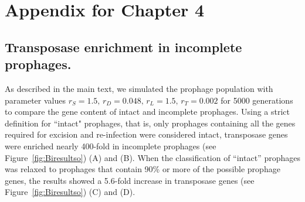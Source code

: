\chapter{Appendix for Chapter 4}\label{AppE}
\section{Transposase enrichment in incomplete prophages.}
As described in the main text, we simulated the prophage population with parameter values $r_S = 1.5, \, r_D =0.048 , \, r_L =1.5,  \, r_T = 0.002$ for 5000 generations to compare the gene content of intact and incomplete prophages.  Using a strict definition for ``intact" prophages, that is, only prophages containing all the genes required for excision and re-infection were considered intact, transposase genes were enriched nearly 400-fold in incomplete prophages (see Figure~\ref{fig:Biresultso}) (A) and (B). When the classification of ``intact'' prophages was relaxed to prophages that contain 90\% or more of the possible prophage genes, the results showed a 5.6-fold increase in transposase genes (see Figure~\ref{fig:Biresultso}) (C) and (D). 

